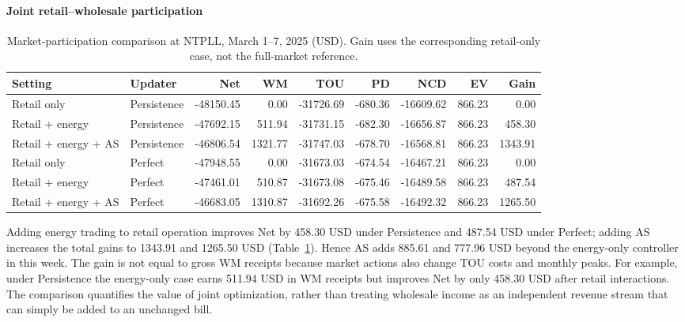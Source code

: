 \documentclass[final,5p,times]{elsarticle}
\begin{document}
\paragraph{Joint retail--wholesale participation}
\begin{table}[p]
\centering
\caption{Market-participation comparison at NTPLL, March 1--7, 2025 (USD). Gain uses the corresponding retail-only case, not the full-market reference.}
\label{tab:weekly_markets}
\footnotesize
\setlength{\tabcolsep}{3pt}
\begin{tabular}{llrrrrrrr}
\toprule
Setting & Updater & Net & WM & TOU & PD & NCD & EV & Gain \\
\midrule
Retail only & Persistence & -48150.45 & 0.00 & -31726.69 & -680.36 & -16609.62 & 866.23 & 0.00 \\
Retail + energy & Persistence & -47692.15 & 511.94 & -31731.15 & -682.30 & -16656.87 & 866.23 & 458.30 \\
Retail + energy + AS & Persistence & -46806.54 & 1321.77 & -31747.03 & -678.70 & -16568.81 & 866.23 & 1343.91 \\
\midrule
Retail only & Perfect & -47948.55 & 0.00 & -31673.03 & -674.54 & -16467.21 & 866.23 & 0.00 \\
Retail + energy & Perfect & -47461.01 & 510.87 & -31673.08 & -675.46 & -16489.58 & 866.23 & 487.54 \\
Retail + energy + AS & Perfect & -46683.05 & 1310.87 & -31692.26 & -675.58 & -16492.32 & 866.23 & 1265.50 \\
\bottomrule
\end{tabular}
\end{table}

Adding energy trading to retail operation improves Net by 458.30 USD under
Persistence and 487.54 USD under Perfect; adding AS increases the total
gains to 1343.91 and 1265.50 USD (Table~\ref{tab:weekly_markets}). Hence AS
adds 885.61 and 777.96 USD beyond the energy-only controller in this week.
The gain is not equal to gross WM receipts because market actions also
change TOU costs and monthly peaks. For example, under Persistence the
energy-only case earns 511.94 USD in WM receipts but improves Net by only
458.30 USD after retail interactions. The comparison quantifies the value
of joint optimization, rather than treating wholesale income as an
independent revenue stream that can simply be added to an unchanged bill.
\end{document}
